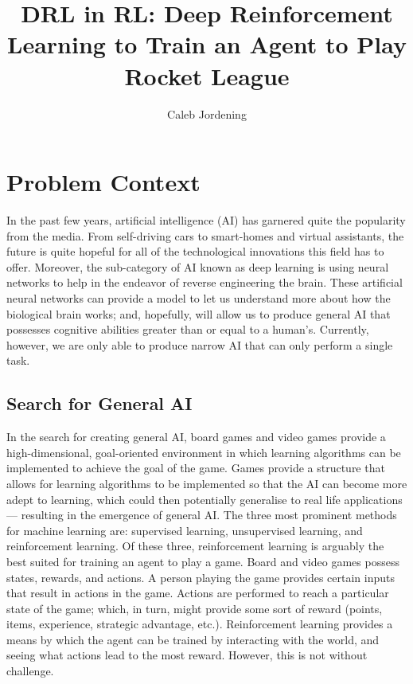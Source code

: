 \documentclass[10pt,twocolumn]{article}
\title{DRL in RL: Deep Reinforcement Learning to Train an Agent to Play Rocket League}
\author{Caleb Jordening}
\affiliation{Occidental College}
\begin{document}
\maketitle

\section {Problem Context}

In the past few years, artificial intelligence (AI) has garnered quite the popularity from the media. From self-driving cars to smart-homes and virtual assistants, the future is quite hopeful for all of the technological innovations this field has to offer. Moreover, the sub-category of AI known as deep learning is using neural networks to help in the endeavor of reverse engineering the brain. These artificial neural networks can provide a model to let us understand more about how the biological brain works; and, hopefully, will allow us to produce general AI that possesses cognitive abilities greater than or equal to a human's. Currently, however, we are only able to produce narrow AI that can only perform a single task. 

\subsection{Search for General AI}
In the search for creating general AI, board games and video games provide a high-dimensional, goal-oriented environment in which learning algorithms can be implemented to achieve the goal of the game. Games provide a structure that allows for learning algorithms to be implemented so that the AI can become more adept to learning, which could then potentially generalise to real life applications — resulting in the emergence of general AI. The three most prominent methods for machine learning are: supervised learning, unsupervised learning, and reinforcement learning. Of these three, reinforcement learning is arguably the best suited for training an agent to play a game. Board and video games possess states, rewards, and actions. A person playing the game provides certain inputs that result in actions in the game. Actions are performed to reach a particular state of the game; which, in turn, might provide some sort of reward (points, items, experience, strategic advantage, etc.). Reinforcement learning provides a means by which the agent can be trained by interacting with the world, and seeing what actions lead to the most reward. However, this is not without challenge.
\end{document}
